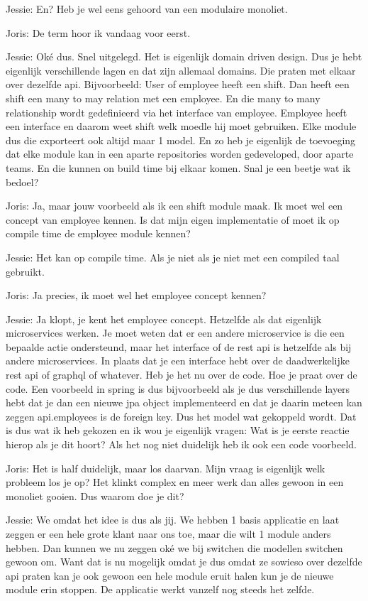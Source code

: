 Jessie: En? Heb je wel eens gehoord van een modulaire monoliet.

Joris: De term hoor ik vandaag voor eerst.

Jessie: Oké dus. Snel uitgelegd. Het is eigenlijk domain driven design. Dus je hebt eigenlijk verschillende lagen en dat zijn allemaal domains. Die praten met elkaar over dezelfde api. Bijvoorbeeld:  User of employee heeft een shift. Dan heeft een shift een many to may relation met een employee. En die many to many relationship wordt gedefinieerd via het interface van employee. Employee heeft een interface en daarom weet shift welk moedle hij moet gebruiken. Elke module dus die exporteert ook altijd maar 1 model. En zo heb je eigenlijk de toevoeging dat elke module kan in een aparte repositories worden gedeveloped, door aparte teams. En die kunnen on build time bij elkaar komen. Snal je een beetje wat ik bedoel?

Joris: Ja, maar jouw voorbeeld als ik een shift module maak. Ik moet wel een concept van employee kennen. Is dat mijn eigen implementatie of moet ik op compile time de employee module kennen?

Jessie: Het kan op compile time. Als je niet als je niet met een compiled taal gebruikt.

Joris: Ja precies, ik moet wel het employee concept kennen?

Jessie: Ja klopt, je kent het employee concept. Hetzelfde als dat eigenlijk microservices werken. Je moet weten dat er een andere microservice is die een bepaalde actie ondersteund, maar het interface of de rest api is hetzelfde als bij andere microservices. In plaats dat je een interface hebt over de daadwerkelijke rest api of graphql of whatever. Heb je het nu over de code. Hoe je praat over de code. Een voorbeeld in spring is dus bijvoorbeeld als je dus verschillende layers hebt dat je dan een nieuwe jpa object implementeerd en dat je daarin meteen kan zeggen api.employees is de foreign key. Dus het model wat gekoppeld wordt. Dat is dus wat ik heb gekozen en ik wou je eigenlijk vragen: Wat is je eerste reactie hierop als je dit hoort? Als het nog niet duidelijk heb ik ook een code voorbeeld.

Joris: Het is half duidelijk, maar los daarvan. Mijn vraag is eigenlijk welk probleem los je op? Het klinkt complex en meer werk dan alles gewoon in een monoliet gooien. Dus waarom doe je dit?

Jessie: We omdat het idee is dus als jij. We hebben 1 basis applicatie en laat zeggen er een hele grote klant naar ons toe, maar die wilt 1 module anders hebben. Dan kunnen we nu zeggen oké we bij switchen die modellen switchen gewoon om. Want dat is nu mogelijk omdat je dus omdat ze sowieso over dezelfde api praten kan je ook gewoon een hele module eruit halen kun je de nieuwe module erin stoppen. De applicatie werkt vanzelf nog steeds het zelfde.

